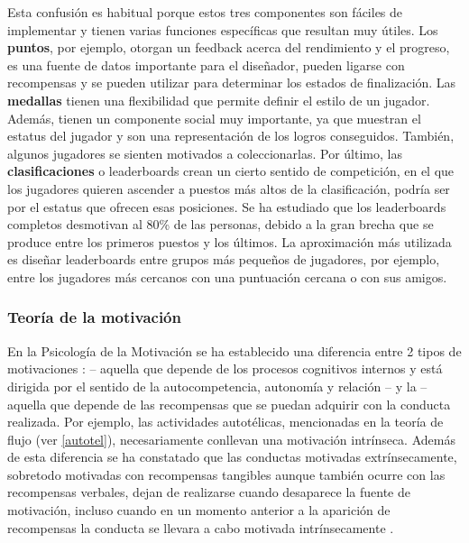 Esta confusión es habitual porque estos tres componentes son fáciles de implementar y tienen varias funciones específicas que resultan muy útiles.
%
Los \textbf{puntos}, por ejemplo, otorgan un feedback acerca del rendimiento y el progreso, es una fuente de datos importante para el diseñador, pueden ligarse con recompensas y se pueden utilizar para determinar los estados de finalización.
%
Las \textbf{medallas} tienen una flexibilidad que permite definir el estilo de un jugador. 
%
Además, tienen un componente social muy importante, ya que muestran el estatus del jugador y son una representación de los logros conseguidos. 
%
También, algunos jugadores se sienten motivados a coleccionarlas.
%
Por último, las \textbf{clasificaciones} o leaderboards crean un cierto sentido de competición, en el que los jugadores quieren ascender a puestos más altos de la clasificación, podría ser por el estatus que ofrecen esas posiciones.
%
Se ha estudiado que los leaderboards completos desmotivan al 80\% de las personas, debido a la gran brecha que se produce entre los primeros puestos y los últimos.
%
La aproximación más utilizada es diseñar leaderboards entre grupos más pequeños de jugadores, por ejemplo, entre los jugadores más cercanos con una puntuación cercana o con sus amigos.


\subsubsection{Teoría de la motivación}
\label{SDT}
\label{PosiblesPeligros}
En la Psicología de la Motivación se ha establecido una diferencia entre 2 tipos de motivaciones \cite{SDT}:   -- aquella que depende de los procesos cognitivos internos y está dirigida por el sentido de la autocompetencia, autonomía y relación -- y la  -- aquella que depende de las recompensas que se puedan adquirir con la conducta realizada.
%
Por ejemplo, las actividades autotélicas, mencionadas en la teoría de flujo (ver \ref{autotel}), necesariamente conllevan una motivación intrínseca.
%
Además de esta diferencia se ha constatado que las conductas motivadas extrínsecamente, sobretodo motivadas con recompensas tangibles aunque también ocurre con las recompensas verbales, dejan de realizarse cuando desaparece la fuente de motivación, incluso cuando en un momento anterior a la aparición de recompensas la conducta se llevara a cabo motivada intrínsecamente
%
\cite{ExtrinsicEatsIntrinsic}.

